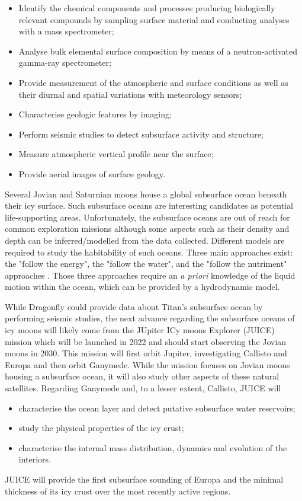 \begin{itemize}
\item Identify the chemical components and processes producing biologically relevant compounds by sampling surface material and conducting analyses with a mass spectrometer;
\item Analyse bulk elemental surface composition by means of a neutron-activated gamma-ray spectrometer;
\item Provide measurement of the atmospheric and surface conditions as well as their diurnal and spatial variations with meteorology sensors; 
\item Characterise geologic features by imaging;
\item Perform seismic studies to detect subsurface activity and structure;
\item Measure atmospheric vertical profile near the surface;
\item Provide aerial images of surface geology.
\end{itemize}

Several Jovian and Saturnian moons house a global subsurface ocean beneath their icy surface. Such subsurface oceans are interesting candidates as potential life-supporting areas. Unfortunately, the subsurface oceans are out of reach for common exploration missions although some aspects such as their density and depth can be inferred/modelled from the data collected. Different models are required to study the habitability of such oceans. Three main approaches exist: the "follow the energy", the "follow the water", and the "follow the nutriment" approaches \citep[see, e.g.,][]{lingam2018extraterrestrial}. Those three approaches require an \textit{a priori} knowledge of the liquid motion within the ocean, which can be provided by a hydrodynamic model.

While Dragonfly could provide data about Titan's subsurface ocean by performing seismic studies, the next advance regarding the subsurface oceans of icy moons will likely come from the JUpiter ICy moons Explorer (JUICE) mission which will be launched in 2022 and should start observing the Jovian moons in 2030. This mission will first orbit Jupiter, investigating Callisto and Europa and then orbit Ganymede. While the mission focuses on Jovian moons housing a subsurface ocean, it will also study other aspects of these natural satellites. Regarding Ganymede and, to a lesser extent, Callisto, JUICE will
\begin{itemize}
\item characterise the ocean layer and detect putative subsurface water reservoirs;
\item study the physical properties of the icy crust;
\item characterise the internal mass distribution, dynamics and evolution of the interiors.
\end{itemize}
JUICE will provide the first subsurface sounding of Europa and the minimal thickness of its icy crust over the most recently active regions.

